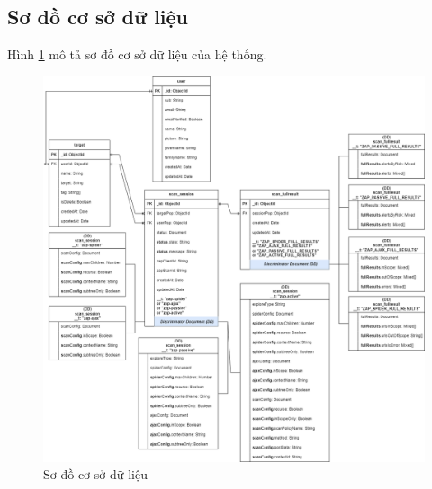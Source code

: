 \subsection{Sơ đồ cơ sở dữ liệu}

Hình \ref{fig:Database} mô tả sơ đồ cơ sở dữ liệu của hệ thống.

\begin{figure}[H]
      \centering
      \includegraphics[width=\textwidth]{applied-thesis-chapters/chapter-3/Sơ đồ cơ sở dữ liệu.png}
      \caption{Sơ đồ cơ sở dữ liệu}
      \label{fig:Database}
\end{figure}